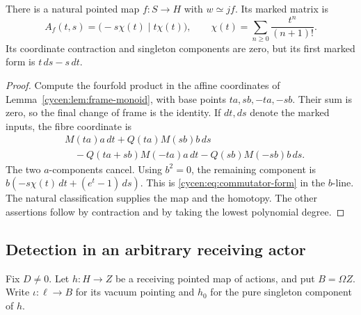 \begin{lemma}\label{cycen:lem:commutator}
There is a natural pointed map $f:S\to H$ with
$w\simeq jf$. Its marked matrix is
\begin{equation}\label{cycen:eq:commutator-form}
 A_f(t,s)=\bigl(-s\chi(t)\mid t\chi(t)\bigr),
 \qquad \chi(t)=\sum_{n\geq0}\frac{t^n}{(n+1)!}.
\end{equation}
Its coordinate contraction and singleton components
are zero, but its first marked form is $t\,ds-s\,dt$.
\end{lemma}
\begin{proof}
Compute the fourfold product in the affine coordinates
of Lemma~\ref{cycen:lem:frame-monoid}, with base points
$ta,sb,-ta,-sb$. Their sum is zero, so the final
change of frame is the identity. If $dt,ds$ denote
the marked inputs, the fibre coordinate is
\[
 \begin{split}
 &M(ta)a\,dt+Q(ta)M(sb)b\,ds\\
 &\hspace{1em}-Q(ta+sb)M(-ta)a\,dt
                         -Q(sb)M(-sb)b\,ds.
 \end{split}
\]
The two $a$-components cancel. Using $b^2=0$,
the remaining component is
$b(-s\chi(t)\,dt+(e^t-1)\,ds)$.
This is \eqref{cycen:eq:commutator-form} in the
$b$-line. The natural classification supplies the
map and the homotopy. The other assertions follow
by contraction and by taking the lowest polynomial
degree.
\end{proof}

\subsection{Detection in an arbitrary receiving actor}

Fix $D\ne0$. Let $h:H\to Z$ be a receiving pointed
map of actions, and put $B=\Omega Z$. Write
$\iota:\ell\to B$ for its vacuum pointing and
$h_0$ for the pure singleton component of $h$.

